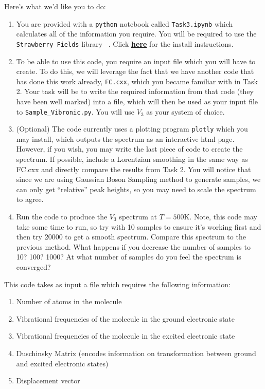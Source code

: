 \documentclass[12pt]{article}
\begin{document}
Here's what we'd like you to do:
\begin{enumerate}
\item You are provided with a \texttt{python} notebook called \texttt{Task3.ipynb} which calculates all of the information you require. You will be required to use the \texttt{Strawberry Fields} library ~\cite{killoran2019strawberry,bromley2020applications}. Click  \href{https://strawberryfields.readthedocs.io/en/stable/_static/install.html}{\underline{\textbf{here}}} for the install instructions.
    \item To be able to use this code, you require an input file which you will have to create. To do this, we will leverage the fact that we have another code that has done this work already, \texttt{FC.cxx}, which you became familiar with in Task 2.  Your task will be to write the required information from that code (they have been well marked) into a file, which will then be used as your input file to \texttt{Sample\_Vibronic.py}. You will use $V_3$ as your system of choice.
     \item (Optional) The code currently uses a plotting program \texttt{plotly} which you may install, which outputs the spectrum as an interactive html page. However, if you wish, you may write the last piece of code to create the spectrum. If possible, include a Lorentzian smoothing in the same way as FC.cxx and directly compare the results from Task 2. You will notice that since we are using Gaussian Boson Sampling method to generate samples, we can only get ``relative'' peak heights, so you may need to scale the spectrum to agree.
     \item Run the code to produce the $V_3$ spectrum at $T=500$K. Note, this code may take some time to run, so try with 10 samples to ensure it's working first and then try 20000 to get a smooth spectrum. Compare this spectrum to the previous method. What happens if you decrease the number of samples to 10? 100? 1000? At what number of samples do you feel the spectrum is converged? 
\end{enumerate}

\noindent This code takes as input a file which requires the following information:
\begin{enumerate}
    \item Number of atoms in the molecule
    \item Vibrational frequencies of the molecule in the ground electronic state
    \item Vibrational frequencies of the molecule in the excited electronic state
    \item Duschinsky Matrix (encodes information on transformation between ground and excited electronic states)
    \item Displacement vector
\end{enumerate}
\end{document}
